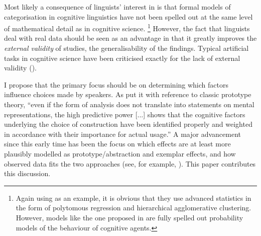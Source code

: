 Most likely a consequence of linguists' interest in  is that formal models of categorisation in cognitive linguistics have not been spelled out at the same level of mathematical detail as in cognitive science.%
\footnote{Again using \cite{DivjakArppe2013} as an example, it is obvious that they use advanced statistics in the form of polytomous regression and hierarchical agglomerative clustering.
However, models like the one proposed in \cite{GriffithsEa2009} are fully spelled out probability models of the behaviour of cognitive agents.}
However, the fact that linguists deal with real data should be seen as an advantage in that it greatly improves the \textit{external validity} of studies, \ie the generalisability of the findings.
Typical artificial tasks in cognitive science have been criticised exactly for the lack of external validity (\eg \citealp{Murphy2003}).


I propose that the primary focus should be on determining which factors influence choices made by speakers.
As \cite[22]{Gries2003} put it with reference to classic prototype theory, ``even if the form of analysis does not translate into statements on mental representations, the high predictive power [...] shows that the cognitive factors underlying the choice of construction have been identified properly and weighted in accordance with their importance for actual usage.''
A major advancement since this early time has been the focus on which effects are at least more plausibly modelled as prototype\slash abstraction and exemplar effects, and how observed data fits the two approaches (see, for example, \citealp{DivjakArppe2013}).
This paper contributes this discussion.





